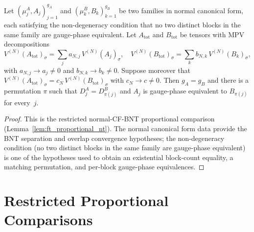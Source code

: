 \begin{lemma}%
    \label{lem:weak_ft_conditional}
    \leanok
    Let $(\mu_j^A, A_j)_{j=1}^{g_A}$ and $(\mu_k^B, B_k)_{k=1}^{g_B}$
    be two families in normal canonical form,
    each satisfying the non-degeneracy condition
    that no two distinct blocks in the same family are gauge-phase
    equivalent.
    Let $A_\mathrm{tot}$ and $B_\mathrm{tot}$ be tensors with
    MPV decompositions
    \[
        V^{(N)}(A_\mathrm{tot})_\sigma = \sum_j a_{N,j}\, V^{(N)}(A_j)_\sigma,
        \quad
        V^{(N)}(B_\mathrm{tot})_\sigma = \sum_k b_{N,k}\, V^{(N)}(B_k)_\sigma,
    \]
    with $a_{N,j} \to a_j \neq 0$ and $b_{N,k} \to b_k \neq 0$.
    Suppose moreover that
    $V^{(N)}(A_\mathrm{tot})_\sigma = c_N\, V^{(N)}(B_\mathrm{tot})_\sigma$
    with $c_N \to c \neq 0$.
    Then $g_A = g_B$ and there is a permutation $\pi$ such that
    $D_j^A = D_{\pi(j)}^B$ and $A_j$ is gauge-phase equivalent to
    $B_{\pi(j)}$ for every~$j$.
\end{lemma}

\begin{proof}\leanok
    This is the restricted normal-CF-BNT proportional comparison
    (Lemma~\ref{lem:ft_proportional_nt}).
    The normal canonical form data provide the BNT separation
    and overlap convergence hypotheses;
    the non-degeneracy condition (no two distinct blocks in the same
    family are gauge-phase equivalent) is one of the hypotheses used to
    obtain an existential block-count equality, a matching permutation,
    and per-block gauge-phase equivalences.
\end{proof}

\section{Restricted Proportional Comparisons}%
\label{sec:assembly_proportional}

